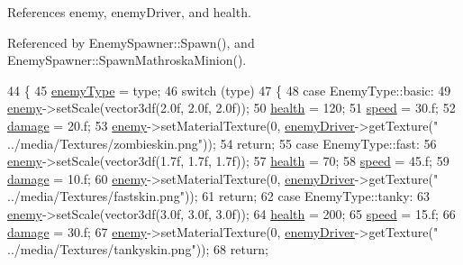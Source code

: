 References enemy, enemy\-Driver, and health.



Referenced by Enemy\-Spawner\-::\-Spawn(), and Enemy\-Spawner\-::\-Spawn\-Mathroska\-Minion().


\begin{DoxyCode}
44 \{
45     \hyperlink{class_enemy_a36bcaf317708c0ed35835bc0f79c7719}{enemyType} = type;
46     \textcolor{keywordflow}{switch} (type)
47     \{
48     \textcolor{keywordflow}{case} EnemyType::basic:
49         \hyperlink{class_enemy_a4befe0ced393215de590152256bf1ee4}{enemy}->setScale(vector3df(2.0f, 2.0f, 2.0f));
50         \hyperlink{class_enemy_a131756bf793f8d63a3b9a2b728992380}{health} = 120;
51         \hyperlink{class_enemy_a98766d083fc49e746a37d0dc69be09e0}{speed} = 30.f;
52         \hyperlink{class_enemy_a5d5917c222119c1d8eb3183c27c7adb7}{damage} = 20.f;
53         \hyperlink{class_enemy_a4befe0ced393215de590152256bf1ee4}{enemy}->setMaterialTexture(0, \hyperlink{_enemy_8cpp_a5fac82651c00f7467e9f43f7e7ba40d5}{enemyDriver}->getTexture(\textcolor{stringliteral}{"
      ../media/Textures/zombieskin.png"}));
54         \textcolor{keywordflow}{return};
55     \textcolor{keywordflow}{case} EnemyType::fast:
56         \hyperlink{class_enemy_a4befe0ced393215de590152256bf1ee4}{enemy}->setScale(vector3df(1.7f, 1.7f, 1.7f));
57         \hyperlink{class_enemy_a131756bf793f8d63a3b9a2b728992380}{health} = 70;
58         \hyperlink{class_enemy_a98766d083fc49e746a37d0dc69be09e0}{speed} = 45.f;
59         \hyperlink{class_enemy_a5d5917c222119c1d8eb3183c27c7adb7}{damage} = 10.f;
60         \hyperlink{class_enemy_a4befe0ced393215de590152256bf1ee4}{enemy}->setMaterialTexture(0, \hyperlink{_enemy_8cpp_a5fac82651c00f7467e9f43f7e7ba40d5}{enemyDriver}->getTexture(\textcolor{stringliteral}{"
      ../media/Textures/fastskin.png"}));
61         \textcolor{keywordflow}{return};
62     \textcolor{keywordflow}{case} EnemyType::tanky:
63         \hyperlink{class_enemy_a4befe0ced393215de590152256bf1ee4}{enemy}->setScale(vector3df(3.0f, 3.0f, 3.0f));
64         \hyperlink{class_enemy_a131756bf793f8d63a3b9a2b728992380}{health} = 200;
65         \hyperlink{class_enemy_a98766d083fc49e746a37d0dc69be09e0}{speed} = 15.f;
66         \hyperlink{class_enemy_a5d5917c222119c1d8eb3183c27c7adb7}{damage} = 30.f;
67         \hyperlink{class_enemy_a4befe0ced393215de590152256bf1ee4}{enemy}->setMaterialTexture(0, \hyperlink{_enemy_8cpp_a5fac82651c00f7467e9f43f7e7ba40d5}{enemyDriver}->getTexture(\textcolor{stringliteral}{"
      ../media/Textures/tankyskin.png"}));
68         \textcolor{keywordflow}{return};

\end{DoxyCode}
